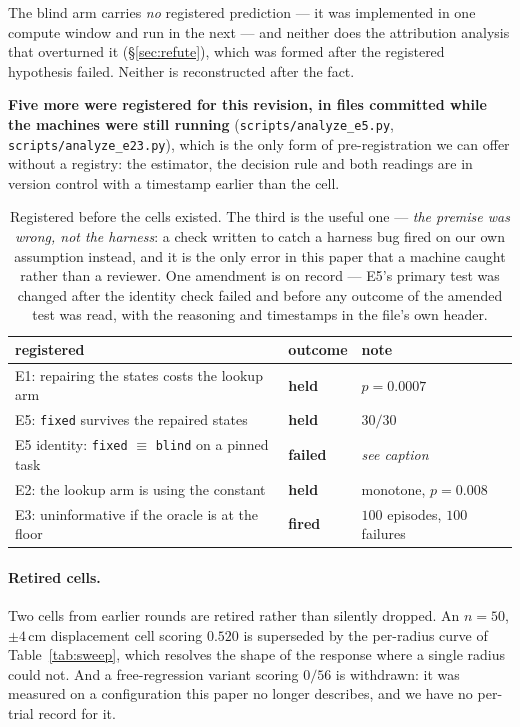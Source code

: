 \documentclass[10pt,twocolumn]{article}
\begin{document}
The blind arm carries \emph{no} registered prediction --- it was implemented in
one compute window and run in the next --- and neither does the attribution
analysis that overturned it (\S\ref{sec:refute}), which was formed after the
registered hypothesis failed. Neither is reconstructed after the fact.

\textbf{Five more were registered for this revision, in files committed while
the machines were still running} (\texttt{scripts/analyze\_e5.py},
\texttt{scripts/analyze\_e23.py}), which is the only form of pre-registration
we can offer without a registry: the estimator, the decision rule and both
readings are in version control with a timestamp earlier than the cell.

\begin{table}[h]\centering\footnotesize
\setlength{\tabcolsep}{4pt}
\begin{tabular}{@{}p{4.05cm}ll@{}}
\toprule
registered & outcome & note \\
\midrule
E1: repairing the states costs the lookup arm &
\textbf{held} & $p = 0.0007$ \\[2pt]
E5: \texttt{fixed} survives the repaired states &
\textbf{held} & $30/30$ \\[2pt]
E5 identity: \texttt{fixed} $\equiv$ \texttt{blind} on a pinned task &
\textbf{failed} & \emph{see caption} \\[2pt]
E2: the lookup arm is using the constant & \textbf{held} & monotone,
$p = 0.008$ \\[2pt]
E3: uninformative if the oracle is at the floor & \textbf{fired} &
$100$ episodes, $100$ failures \\
\bottomrule
\end{tabular}
\caption{Registered before the cells existed. The third is the useful one ---
\emph{the premise was wrong, not the harness}: a
check written to catch a harness bug fired on our own assumption instead, and
it is the only error in this paper that a machine caught rather than a
reviewer. One amendment is on record --- E5's primary test was changed after
the identity check failed and before any outcome of the amended test was read,
with the reasoning and timestamps in the file's own header.}
\label{tab:prereg}
\end{table}

\paragraph{Retired cells.} Two cells from earlier rounds are retired rather
than silently dropped. An $n{=}50$, $\pm4$\,cm displacement cell scoring
$0.520$ is superseded by the per-radius curve of Table~\ref{tab:sweep}, which
resolves the shape of the response where a single radius could not. And a
free-regression variant scoring $0/56$ is withdrawn: it was measured on a
configuration this paper no longer describes, and we have no per-trial record
for it.
\end{document}
